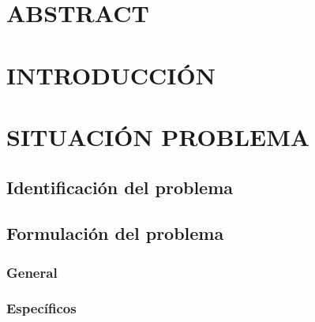 \documentclass[12pt,a4paper,oneside]{book}
\begin{document}

\chapter*{\centering \large ABSTRACT}



\chapter*{\centering \large INTRODUCCIÓN} %


\chapter{SITUACIÓN PROBLEMA}

\section{Identificación del problema}

\section{Formulación del problema}

\subsection{General}

\subsection{Específicos}
\end{document}
